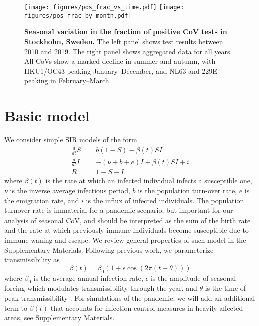 \documentclass[rmp, reprint, superscriptaddress, floatfix,amsmath]{revtex4-1}
\newcommand{\Jan}[1]{{\color{deepsaffron}Jan: #1}}
\newcommand{\Emma}[1]{{\color{purple}Emma: #1}}
\begin{document}
\begin{figure*}
    \centering
    \texttt{[image: figures/pos\_frac\_vs\_time.pdf]}
    \texttt{[image: figures/pos\_frac\_by\_month.pdf]}
    \caption{{\bf Seasonal variation in the fraction of positive CoV tests in Stockholm, Sweden.} The left panel shows test results between 2010 and 2019. The right panel shows aggregated data for all years. All CoVs show a marked decline in summer and autumn, with HKU1/OC43 peaking January--December, and NL63 and 229E peaking in February--March. %
    }
    \label{fig:seasonal_CoV}
\end{figure*}

\section{Basic model}
We consider simple SIR models \citep{kermack_contributions_1991} of the form 
\begin{equation}
\begin{split}
\frac{d}{dt} S & = b(1-S) - \beta(t) S I \\
\frac{d}{dt} I & = -(\nu+b+e) I + \beta(t) S I + i\\
R & = 1-S-I
\end{split}
\label{eq:SIR}
\end{equation}
where $\beta(t)$ is the rate at which an infected individual infects a susceptible one, $\nu$ is the inverse average infectious period, $b$ is the population turn-over rate, $e$ is the emigration rate, and $i$ is the influx of infected individuals.
The population turnover rate is immaterial for a pandemic scenario, but important for our analysis of seasonal CoV, and should be interpreted as the sum of the birth rate and the rate at which previously immune individuals become susceptible due to immune waning and escape.
We review general properties of such model in the Supplementary Materials. 
Following previous work, we parameterize transmissibility as 
\begin{equation}
\beta(t) = \beta_0\left(1+\epsilon\cos(2\pi (t-\theta))\right)
\label{eq:transmissibility}
\end{equation}
where $\beta_0$ is the average annual infection rate, $\epsilon$ is the amplitude of seasonal forcing which modulates transmissibility through the year, and $\theta$ is the time of peak transmissibility \citep{dushoff_dynamical_2004,chen_regular_2017}.
For simulations of the pandemic, we will add an additional term to $\beta(t)$ that accounts for infection control measures in heavily affected areas, see Supplementary Materials.
\end{document}
